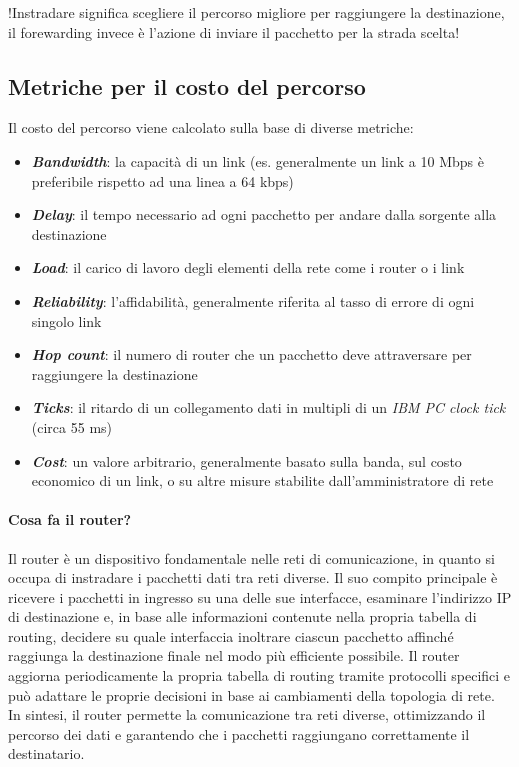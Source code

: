 !Instradare significa scegliere il percorso migliore per raggiungere la destinazione, il forewarding invece è l'azione di inviare il pacchetto per la strada scelta!

\subsection{Metriche per il costo del percorso}
Il costo del percorso viene calcolato sulla base di diverse metriche:
\begin{itemize}
    \item \textbf{\textit{Bandwidth}}: la capacità di un link (es. generalmente un link a 10 Mbps è preferibile rispetto ad una linea a 64 kbps)
    \item \textbf{\textit{Delay}}: il tempo necessario ad ogni pacchetto per andare dalla sorgente alla destinazione
    \item \textbf{\textit{Load}}: il carico di lavoro degli elementi della rete come i router o i link
    \item \textbf{\textit{Reliability}}: l'affidabilità, generalmente riferita al tasso di errore di ogni singolo link
    \item \textbf{\textit{Hop count}}: il numero di router che un pacchetto deve attraversare per raggiungere la destinazione
    \item \textbf{\textit{Ticks}}: il ritardo di un collegamento dati in multipli di un \textit{IBM PC clock tick} (circa 55 ms)
    \item \textbf{\textit{Cost}}: un valore arbitrario, generalmente basato sulla banda, sul costo economico di un link, o su altre misure stabilite dall'amministratore di rete
\end{itemize}

\paragraph{Cosa fa il router?}

Il router è un dispositivo fondamentale nelle reti di comunicazione, in quanto si occupa di instradare i pacchetti dati tra reti diverse. Il suo compito principale è ricevere i pacchetti in ingresso su una delle sue interfacce, esaminare l'indirizzo IP di destinazione e, in base alle informazioni contenute nella propria tabella di routing, decidere su quale interfaccia inoltrare ciascun pacchetto affinché raggiunga la destinazione finale nel modo più efficiente possibile. Il router aggiorna periodicamente la propria tabella di routing tramite protocolli specifici e può adattare le proprie decisioni in base ai cambiamenti della topologia di rete. In sintesi, il router permette la comunicazione tra reti diverse, ottimizzando il percorso dei dati e garantendo che i pacchetti raggiungano correttamente il destinatario.

